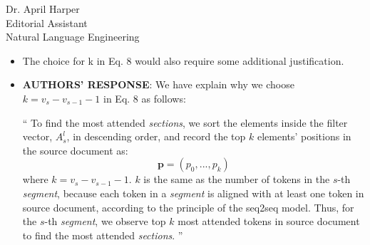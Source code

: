 \documentclass[11pt]{letter} %
\theoremstyle{definition}
\begin{document}
\begin{letter}{Dr. April Harper \\
            Editorial Assistant \\
			Natural Language Engineering}
\begin{enumerate}
\begin{itemize}
                We introduced Newsroom and DUC 2002 in Section 3.1 and analysis the generalization of our proposed ATTF+SBD (Table 12) in the "Generalization" part of Section 3.4.
                The details are as follows:
                 \begin{itemize}
                	\item[-] ``Also we tried our model on other two abstractive summarization datasets about news, which are Newsroom (Grusky et al., 2018) and DUC 2002. For Newsroom, there are 1,321,995 document-summary pairs, which are divided into training (76\%), development (8\%), test (8\%), and unreleased test (8\%). At testing, we use the 8\% released test data. DUC-2002 (DUC) is a test set of document-summary pairs. We use the models trained on CNNDM to do the test on DUC and demonstrate the generalization of the models. ''  (Section 3.1)
                	\item[-] `` Table 12 shows the generalization of our abstractive system to other two datasets, Newsroom and DUC 2002, where our
                	proposed models achieve better scores than vanilla CNN seq2seq model in terms of ROUGE scores, readability and repeatedness. 
                	We use the same settings of $\beta=3$ ($sz$ in previous version) in Section 2.2 and $n=5$ in Eq.(11), because the proportion of segments with length greater than 3 and reference summaries with LCS greater than 5 were about 90\%. As show in Table 12, our proposed models can be better generalization on other datasets about news, along with repetition reduction and the improvement of readability.
                	This shows that our proposed models can be generalized well.
                	''  (Section 3.4)
        
                \end{itemize}

				\item The choice for k in Eq. 8 would also require some additional justification.
				\item[] \textbf{AUTHORS' RESPONSE}:  
				We have explain why we choose $k=v_{s}-v_{s-1}-1$ in Eq. 8 as follows:
				
				``
                To find the most attended \textit{sections}, 
                we sort the elements inside the filter vector, 
                $A_{s}^{l}$, in descending order, 
                and record the top $k$ elements' positions in 
                the source document as: 
                \begin{equation}
                    \mathbf{p}=(p_{0},...,p_{k}) \nonumber
                \end{equation}
                where $k=v_{s}-v_{s-1}-1$. 
                $k$ is the same as the number of tokens in the $s$-th \textit{segment},
                because each token in a \textit{segment} is aligned with at least one token in source document, according to the principle of the seq2seq model. Thus, for the $s$-th \textit{segment}, we observe top $k$ most attended tokens in source document to find the most attended \textit{sections}. 
				''


\end{itemize}
\end{enumerate}
\end{letter}
\end{document}
